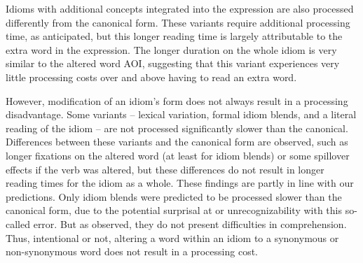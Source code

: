 \documentclass[output=paper,modfonts,nonflat]{langsci/langscibook}
\begin{document}
Idioms with additional concepts integrated into the expression are also processed differently from the canonical form. These variants require additional processing time, as anticipated, but this longer reading time is largely attributable to the extra word in the expression. The longer duration on the whole idiom is very similar to the altered word AOI, suggesting that this variant experiences very little processing costs over and above having to read an extra word.
 
However, modification of an idiom's form does not always result in a processing disadvantage. Some variants -- lexical variation, formal idiom blends, and a literal reading of the idiom -- are not processed significantly slower than the canonical. Differences between these variants and the canonical form are observed, such as longer fixations on the altered word (at least for idiom blends) or some spillover effects if the verb was altered, but these differences do not result in longer reading times for the idiom as a whole. These findings are partly in line with our predictions. Only idiom blends were predicted to be processed slower than the canonical form, due to the potential surprisal at or unrecognizability with this so-called error. But as observed, they do not present difficulties in comprehension. Thus, intentional or not, altering a word within an idiom to a synonymous or non-synonymous word does not result in a processing cost.
\end{document}

